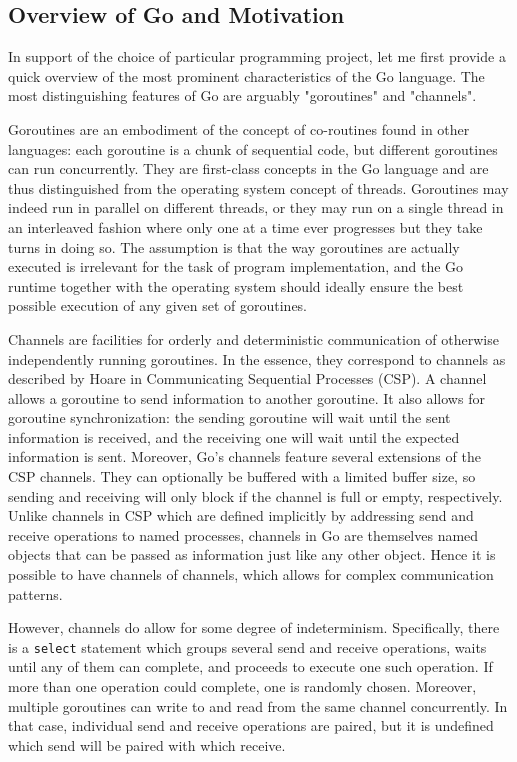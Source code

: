 \documentclass {article}
\begin{document}
\subsection{Overview of Go and Motivation}

In support of the choice of particular programming project, let me first provide
a quick overview of the most prominent characteristics of the Go language. The
most distinguishing features of Go are arguably "goroutines" and "channels".

Goroutines are an embodiment of the concept of co-routines found in other
languages: each goroutine is a chunk of sequential code, but different
goroutines can run concurrently. They are first-class concepts in the Go
language and are thus distinguished from the operating system concept of
threads. Goroutines may indeed run in parallel on different threads, or they may
run on a single thread in an interleaved fashion where only one at a time ever
progresses but they take turns in doing so. The assumption is that the way
goroutines are actually executed is irrelevant for the task of program
implementation, and the Go runtime together with the operating system should
ideally ensure the best possible execution of any given set of goroutines.

Channels are facilities for orderly and deterministic communication of otherwise
independently running goroutines. In the essence, they correspond to channels as
described by Hoare in Communicating Sequential Processes (CSP). A
channel allows a goroutine to send information to another goroutine. It also
allows for goroutine synchronization: the sending goroutine will wait until the
sent information is received, and the receiving one will wait until the expected
information is sent. Moreover, Go's channels feature several extensions of the
CSP channels. They can optionally be buffered with a limited buffer size, so
sending and receiving will only block if the channel is full or empty,
respectively. Unlike channels in CSP which are defined implicitly by addressing
send and receive operations to named processes, channels in Go are themselves
named objects that can be passed as information just like any other object.
Hence it is possible to have channels of channels, which allows for complex
communication patterns.

However, channels do allow for some degree of indeterminism. Specifically, there
is a \lstinline|select| statement which groups several send and receive
operations, waits until any of them can complete, and proceeds to execute one
such operation. If more than one operation could complete, one is randomly
chosen. Moreover, multiple goroutines can write to and read from the same
channel concurrently. In that case, individual send and receive operations are
paired, but it is undefined which send will be paired with which receive.
\end{document}
